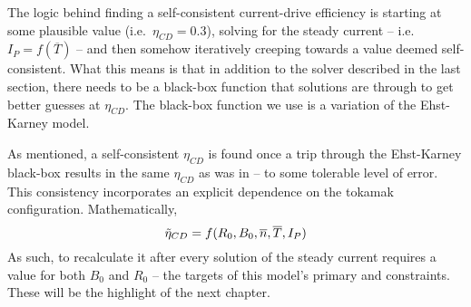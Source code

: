 The logic behind finding a self-consistent current-drive efficiency is starting at some plausible value (i.e.\ $\eta_{CD} = 0.3$), solving for the steady current -- i.e.\ $I_P = f(\overline T)$ -- and then somehow iteratively creeping towards a value deemed self-consistent. What this means is that in addition to the solver described in the last section, there needs to be a black-box function that solutions are  through to get better guesses at $\eta_{CD}$. The black-box function we use is a variation of the Ehst-Karney model. \cite{ehstkarney}

As mentioned, a self-consistent $\eta_{CD}$ is found once a trip through the Ehst-Karney black-box results in the same $\eta_{CD}$ as was  in -- to some tolerable level of error. This consistency incorporates an explicit dependence on the tokamak configuration. Mathematically,
\begin{equation}
	\tilde \eta_{CD} = f( R_0, B_0, \overline n, \overline T, I_P )
	\myequations{Current Drive Efficiency -- $\eta_{CD}$}
\end{equation}
As such, to recalculate it after every solution of the steady current requires a value for both $B_0$ and $R_0$ -- the targets of this model's primary and  constraints. These will be the highlight of the next chapter.

%
